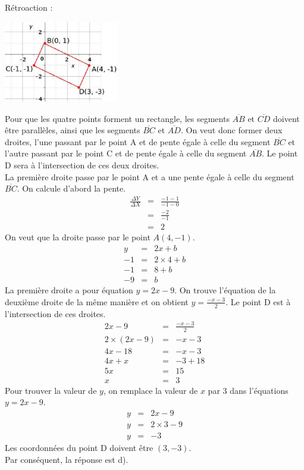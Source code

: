 \documentclass[letterpaper, 12pt]{article}
\begin{document}
R\'etroaction :\\
\begin{center}
 \includegraphics[width=5cm,bb=14 14 403 291]{Q2475.eps}
\end{center}
Pour que les quatre points forment un rectangle, les segments $\overline{AB}$ et $\overline{CD}$ doivent \^etre parall\`eles, ainsi que les segments $\overline{BC}$ et $\overline{AD}$. On veut donc former deux droites, l'une passant par le point A et de pente \'egale \`a celle du segment $\overline{BC}$ et l'autre passant par le point C et de pente \'egale \`a celle du segment $\overline{AB}$. Le point D sera \`a l'intersection de ces deux droites.\\
La premi\`ere droite passe par le point A et a une pente \'egale \`a celle du segment $\overline{BC}$. On calcule d'abord la pente.
\begin{eqnarray*}
\frac{\Delta Y}{\Delta X}&=&\frac{-1-1}{-1-0} \\[2mm]
&=&\frac{-2}{-1} \\[2mm]
&=&2
\end{eqnarray*}
On veut que la droite passe par le point $A(4, -1)$.
\begin{eqnarray*}
 y&=&2x+b\\
 -1&=&2\times4+b\\
 -1&=&8+b\\
 -9&=&b
\end{eqnarray*}
La premi\`ere droite a pour \'equation $y=2x-9$. On trouve l'\'equation de la deuxi\`eme droite de la m\^eme mani\`ere et on obtient $y=\frac{-x-3}{2}$.
Le point D est \`a l'intersection de ces droites.
\begin{eqnarray*}
 2x-9&=&\frac{-x-3}{2}\\[2mm]
 2\times (2x-9)&=&-x-3\\
 4x-18&=&-x-3\\
 4x+x&=&-3+18\\
5x&=&15\\
x&=&3
\end{eqnarray*}
Pour trouver la valeur de $y$, on remplace la valeur de $x$ par 3 dans l'\'equations $y=2x-9$.
\begin{eqnarray*}
 y&=&2x-9\\
 y&=&2\times 3-9\\
 y&=&-3
\end{eqnarray*}
Les coordonn\'ees du point D doivent \^etre $(3, -3)$.\\
Par cons\'equent, la r\'eponse est d).\\
\end{document}
